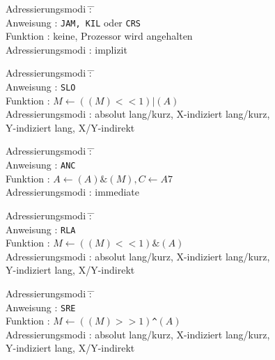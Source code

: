 \documentclass[12pt,a4paper,twoside]{report}
\newcommand{\tty}[1]{{\tt #1}}
\begin{document}
\begin{tabbing}
Adressierungsmodi \= : \= \kill \\
Anweisung         \> : \> \tty{JAM, KIL} oder \tty{CRS} \\
Funktion          \> : \> keine, Prozessor wird angehalten \\
Adressierungsmodi \> : \> implizit \\
\end{tabbing}
\begin{tabbing}
Adressierungsmodi \= : \= \kill \\
Anweisung         \> : \> \tty{SLO} \\
Funktion          \> : \> $M\leftarrow((M)<<1)|(A)$ \\
Adressierungsmodi \> : \> absolut lang/kurz, X-indiziert lang/kurz, \\
                  \>   \> Y-indiziert lang, X/Y-indirekt \\
\end{tabbing}
\begin{tabbing}
Adressierungsmodi \= : \= \kill \\
Anweisung         \> : \> \tty{ANC} \\
Funktion          \> : \> $A\leftarrow(A)\&(M), C\leftarrow A7$ \\
Adressierungsmodi \> : \> immediate \\
\end{tabbing}
\begin{tabbing}
Adressierungsmodi \= : \= \kill \\
Anweisung         \> : \> \tty{RLA} \\
Funktion          \> : \> $M\leftarrow((M)<<1)\&(A)$ \\
Adressierungsmodi \> : \> absolut lang/kurz, X-indiziert lang/kurz, \\
                  \>   \> Y-indiziert lang, X/Y-indirekt \\
\end{tabbing}
\begin{tabbing}
Adressierungsmodi \= : \= \kill \\
Anweisung         \> : \> \tty{SRE} \\
Funktion          \> : \> $M\leftarrow((M)>>1)$\verb!^!$(A)$ \\
Adressierungsmodi \> : \> absolut lang/kurz, X-indiziert lang/kurz, \\
                  \>   \> Y-indiziert lang, X/Y-indirekt \\
\end{tabbing}
\end{document}
